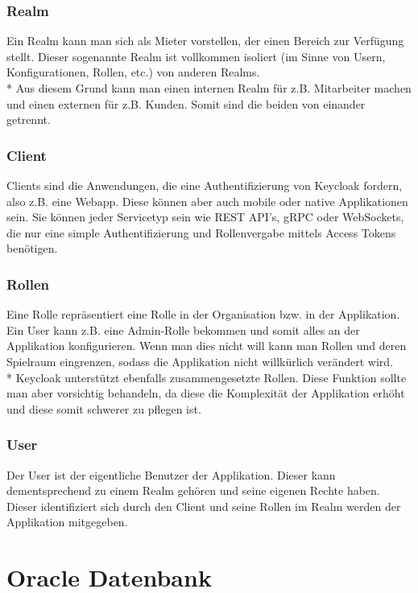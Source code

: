 \subsubsection{Realm}
Ein Realm kann man sich als Mieter vorstellen, der einen Bereich zur Verfügung stellt. Dieser sogenannte Realm ist vollkommen isoliert (im Sinne von Usern, Konfigurationen, Rollen, etc.)
von anderen Realms. \\* Aus diesem Grund kann man einen internen Realm für z.B. Mitarbeiter machen und einen externen für z.B. Kunden. Somit sind die beiden von einander getrennt. \cite{KeyCloakCodex}

\subsubsection{Client}
Clients sind die Anwendungen, die eine Authentifizierung von Keycloak fordern, also z.B. eine Webapp. Diese können aber auch mobile oder native Applikationen sein.
Sie können jeder Servicetyp sein wie REST API's, gRPC oder WebSockets, die nur eine simple Authentifizierung und Rollenvergabe mittels Access Tokens benötigen. \cite{KeyCloakCodex}

\subsubsection{Rollen}
Eine Rolle repräsentiert eine Rolle in der Organisation bzw. in der Applikation. Ein User kann z.B. eine Admin-Rolle bekommen und somit alles an der Applikation konfigurieren.
Wenn man dies nicht will kann man Rollen und deren Spielraum eingrenzen, sodass die Applikation nicht willkürlich verändert wird. \\*
Keycloak unterstützt ebenfalls zusammengesetzte Rollen. Diese Funktion sollte man aber vorsichtig behandeln, da diese die Komplexität der Applikation erhöht und diese somit schwerer zu pflegen ist. \cite{KeyCloakCodex}

\subsubsection{User}
Der User ist der eigentliche Benutzer der Applikation. Dieser kann dementsprechend zu einem Realm gehören und seine eigenen Rechte haben.
Dieser identifiziert sich durch den Client und seine Rollen im Realm werden der Applikation mitgegeben.


\section{Oracle Datenbank}
\author{David Ignjatovic}

